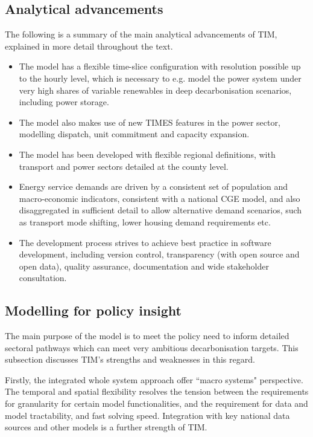 \documentclass[gmd,manuscript]{copernicus}
\begin{document}
\subsection{Analytical advancements}
The following is a summary of the main analytical advancements of TIM, explained in more detail throughout the text. 
\begin{itemize}
\item The model has a flexible time-slice configuration with resolution possible up to the hourly level, which is necessary to e.g. model the power system under very high shares of variable renewables in deep decarbonisation scenarios, including power storage. 
\item The model also makes use of new TIMES features in the power sector, modelling dispatch, unit commitment and capacity expansion.
\item The model has been developed with flexible regional definitions, with transport and power sectors detailed at the county level. 
\item Energy service demands are driven by a consistent set of population and macro-economic indicators, consistent with a national CGE model, and also disaggregated in sufficient detail to allow alternative demand scenarios, such as transport mode shifting, lower housing demand requirements etc.
\item The development process strives to achieve best practice in software development, including version control, transparency (with open source and open data), quality assurance, documentation and wide stakeholder consultation. 
\end{itemize}

\subsection{Modelling for policy insight}
The main purpose of the model is to meet the policy need to inform detailed sectoral pathways which can meet very ambitious decarbonisation targets. This subsection discusses TIM's strengths and weaknesses in this regard. 

Firstly, the integrated whole system approach offer ``macro systems" perspective. The temporal and spatial flexibility resolves the tension between the requirements for granularity for certain model functionalities, and the requirement for data and model tractability, and fast solving speed. Integration with key national data sources and other models is a further strength of TIM. 
\end{document}
